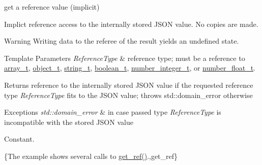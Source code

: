 get a reference value (implicit) 

Implict reference access to the internally stored J\-S\-O\-N value. No copies are made.

\begin{DoxyWarning}{Warning}
Writing data to the referee of the result yields an undefined state.
\end{DoxyWarning}

\begin{DoxyTemplParams}{Template Parameters}
{\em Reference\-Type} & reference type; must be a reference to \hyperlink{classnlohmann_1_1basic__json_ab00b882d39306d663c23dab110f5cae0}{array\-\_\-t}, \hyperlink{classnlohmann_1_1basic__json_a0ac9894c9de8dc551cf2e5f1c605537f}{object\-\_\-t}, \hyperlink{classnlohmann_1_1basic__json_ab63e618bbb0371042b1bec17f5891f42}{string\-\_\-t}, \hyperlink{classnlohmann_1_1basic__json_af3bc3e83aa162d7ba4df16a949872723}{boolean\-\_\-t}, \hyperlink{classnlohmann_1_1basic__json_ac4b10b2364f26ce47bdb9a413ff04a59}{number\-\_\-integer\-\_\-t}, or \hyperlink{classnlohmann_1_1basic__json_a74a0013e847fdc574b48f931f0e757e1}{number\-\_\-float\-\_\-t}.\\
\hline
\end{DoxyTemplParams}
\begin{DoxyReturn}{Returns}
reference to the internally stored J\-S\-O\-N value if the requested reference type {\itshape Reference\-Type} fits to the J\-S\-O\-N value; throws std\-::domain\-\_\-error otherwise
\end{DoxyReturn}

\begin{DoxyExceptions}{Exceptions}
{\em std\-::domain\-\_\-error} & in case passed type {\itshape Reference\-Type} is incompatible with the stored J\-S\-O\-N value\\
\hline
\end{DoxyExceptions}
Constant.

\{The example shows several calls to {\ttfamily \hyperlink{classnlohmann_1_1basic__json_a4f332e90f3cae562d0c3fa6ba48f74f9}{get\-\_\-ref()}}.,get\-\_\-ref\}

